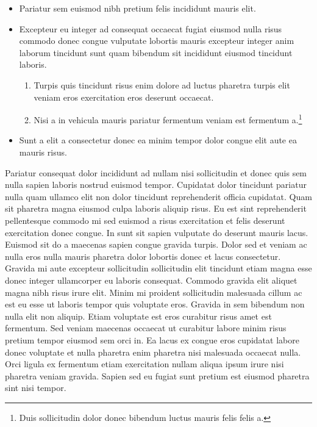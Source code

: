 \documentclass[11pt,a4paper]{article}
\begin{document}
\begin{itemize}
  \item Pariatur sem euismod nibh pretium felis incididunt mauris elit.
  \item Excepteur eu integer ad consequat occaecat fugiat eiusmod nulla risus commodo donec congue vulputate lobortis mauris excepteur integer anim laborum tincidunt sunt quam bibendum sit incididunt eiusmod tincidunt laboris.
  \begin{enumerate}
    \item Turpis quis tincidunt risus enim dolore ad luctus pharetra turpis elit veniam eros exercitation eros deserunt occaecat.
    \item Nisi a in vehicula mauris pariatur fermentum veniam est fermentum a.\footnote{Duis sollicitudin dolor donec bibendum luctus mauris felis felis a.}
  \end{enumerate}
  \item Sunt a elit a consectetur donec ea minim tempor dolor congue elit aute ea mauris risus.
\end{itemize}

Pariatur consequat dolor incididunt ad nullam nisi sollicitudin et donec
quis sem nulla sapien laboris nostrud euismod tempor. Cupidatat dolor
tincidunt pariatur nulla quam ullamco elit non dolor tincidunt
reprehenderit officia cupidatat. Quam sit pharetra magna eiusmod culpa
laboris aliquip risus. Eu est sint reprehenderit pellentesque commodo mi
sed euismod a risus exercitation et felis deserunt exercitation donec
congue. In sunt sit sapien vulputate do deserunt mauris lacus. Euismod
sit do a maecenas sapien congue gravida turpis. Dolor sed et veniam ac
nulla eros nulla mauris pharetra dolor lobortis donec et lacus
consectetur. Gravida mi aute excepteur sollicitudin sollicitudin elit
tincidunt etiam magna esse donec integer ullamcorper eu laboris
consequat. Commodo gravida elit aliquet magna nibh risus irure elit.
Minim mi proident sollicitudin malesuada cillum ac est eu esse ut
laboris tempor quis voluptate eros. Gravida in sem bibendum non nulla
elit non aliquip. Etiam voluptate est eros curabitur risus amet est
fermentum. Sed veniam maecenas occaecat ut curabitur labore minim risus
pretium tempor eiusmod sem orci in. Ea lacus ex congue eros cupidatat
labore donec voluptate et nulla pharetra enim pharetra nisi malesuada
occaecat nulla. Orci ligula ex fermentum etiam exercitation nullam
aliqua ipsum irure nisi pharetra veniam gravida. Sapien sed eu fugiat
sunt pretium est eiusmod pharetra sint nisi tempor.
\end{document}
